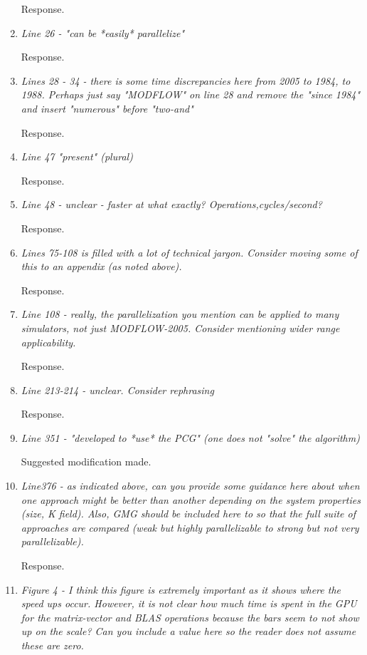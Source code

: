 \documentclass[12pt]{article} %
\begin{document}
\begin{enumerate}
Response. 

\item \textit{Line 26 - "can be *easily* parallelize"} 

Response. 

\item \textit{Lines 28 - 34 - there is some time discrepancies here from 2005 to 1984, to 1988. Perhaps just say "MODFLOW" on line 28 and remove the "since 1984" and insert "numerous" before "two-and" } 

Response.

\item \textit{Line 47 "present" (plural)} 

Response. 

\item \textit{Line 48 - unclear - faster at what exactly? Operations,cycles/second? } 

Response.

\item \textit{Lines 75-108 is filled with a lot of technical jargon. Consider moving some of this to an appendix (as noted above). } 

Response.

\item \textit{Line 108 - really, the parallelization you mention can be applied to many simulators, not just MODFLOW-2005. Consider mentioning wider range applicability. } 

Response.

\item \textit{Line 213-214 - unclear. Consider rephrasing } 

Response.

\item \textit{Line 351 - "developed to *use* the PCG" (one does not "solve" the algorithm) } 

Suggested modification made.

\item \textit{Line376 - as indicated above, can you provide some guidance here about when one approach might be better than another depending on the system properties (size, K field). Also, GMG should be included here to so that the full suite of approaches are compared (weak but highly parallelizable to strong but not very parallelizable). } 

Response.

\item \textit{Figure 4 - I think this figure is extremely important as it shows where the speed ups occur. However, it is not clear how much time is spent in the GPU for the matrix-vector and BLAS operations because the bars seem to not show up on the scale? Can you include a value here so the reader does not assume these are zero. } 


\end{enumerate}
\end{document}
